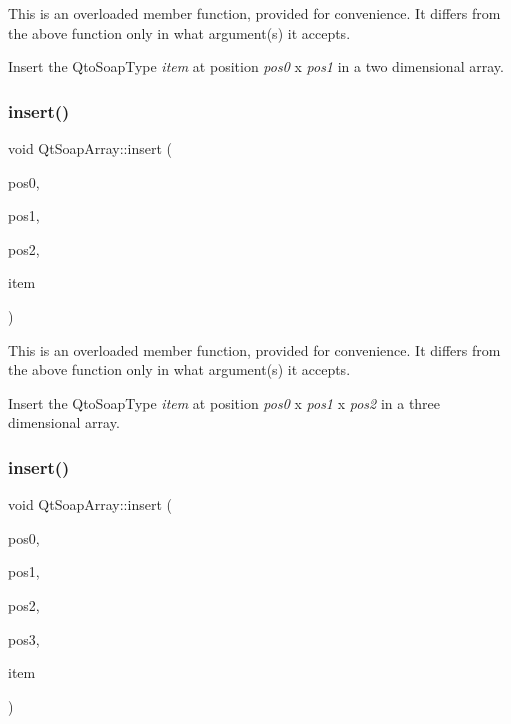 This is an overloaded member function, provided for convenience. It differs from the above function only in what argument(s) it accepts.

Insert the Qto\+Soap\+Type {\itshape item} at position {\itshape pos0} x {\itshape pos1} in a two dimensional array. \mbox{\label{class_qt_soap_array_a44e2b7ea13cf3f94f48a6751ff3d448b}} 
\subsubsection{\texorpdfstring{insert()}{insert()}\hspace{0.1cm}{\footnotesize\ttfamily [3/5]}}
{\footnotesize\ttfamily void Qt\+Soap\+Array\+::insert (\begin{DoxyParamCaption}\item[{int}]{pos0,  }\item[{int}]{pos1,  }\item[{int}]{pos2,  }\item[{\mbox{\hyperlink{class_qt_soap_type}{Qt\+Soap\+Type}} $\ast$}]{item }\end{DoxyParamCaption})}

This is an overloaded member function, provided for convenience. It differs from the above function only in what argument(s) it accepts.

Insert the Qto\+Soap\+Type {\itshape item} at position {\itshape pos0} x {\itshape pos1} x {\itshape pos2} in a three dimensional array. \mbox{\label{class_qt_soap_array_a5c02c84ee4a0b8e4836df3607aecb5a4}} 
\subsubsection{\texorpdfstring{insert()}{insert()}\hspace{0.1cm}{\footnotesize\ttfamily [4/5]}}
{\footnotesize\ttfamily void Qt\+Soap\+Array\+::insert (\begin{DoxyParamCaption}\item[{int}]{pos0,  }\item[{int}]{pos1,  }\item[{int}]{pos2,  }\item[{int}]{pos3,  }\item[{\mbox{\hyperlink{class_qt_soap_type}{Qt\+Soap\+Type}} $\ast$}]{item }\end{DoxyParamCaption})}

